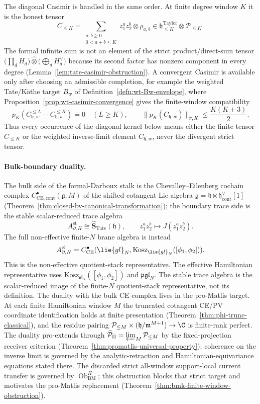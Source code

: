 \documentclass[11pt]{memoir}
\begin{document}
The diagonal Casimir is handled in the same order.  At finite degree
window \(K\) it is the honest tensor
\[
  C_{\le K}=\sum_{\substack{a,b\ge0\\0<a+b\le K}}
    z_1^az_2^b\otimes\rho_{a,b}
  \in \mathfrak h^{\mathrm{Taylor}}_{\le K}\otimes\mathcal P_{\le K}.
\]
The formal infinite sum is not an element of the strict
product/direct-sum tensor
\(\bigl(\prod_d H_d\bigr)\widehat\otimes\bigl(\bigoplus_d H_d^\vee\bigr)\)
because its second factor has nonzero component in every degree
(Lemma~\ref{lem:tate-casimir-obstruction}).  A convergent Casimir is
available only after choosing an admissible completion, for example the
weighted Tate/K\"othe target \(B_w\) of
Definition~\ref{defn:wt-Bw-envelope}, where
Proposition~\ref{prop:wt-casimir-convergence} gives the finite-window
compatibility
\[
  p_K(C_{\mathfrak h,w}^{\le L}-C_{\mathfrak h,w}^{\le K})=0
  \quad(L\ge K),
  \qquad
  \|p_K(C_{\mathfrak h,w})\|_{\pi,K}\le \frac{K(K+3)}2 .
  \]
Thus every occurrence of the diagonal kernel below means either the
finite tensor \(C_{\le K}\) or the weighted inverse-limit element
\(C_{\mathfrak h,w}\), never the divergent strict tensor.

\paragraph{Bulk-boundary duality.}
The bulk side of the formal-Darboux stalk is the
Chevalley--Eilenberg cochain complex
\(C^\bullet_{\mathrm{CE,cont}}(\mathfrak g,M)\) of the
shifted-cotangent Lie algebra
\(\mathfrak g=\mathfrak h\ltimes\mathfrak h^\vee_{\mathrm{cont}}[1]\)
(Theorem~\ref{thm:closed-bv-canonical-transformation}); the boundary
trace side is the stable scalar-reduced trace algebra
\[
  A_{\partial,H}^{\mathrm{st}}
    \cong \widehat{\mathbf S}_{\mathrm{Tate}}(\mathfrak h),
  \qquad
  z_1^az_2^b\longmapsto J(z_1^az_2^b).
\]
The full non-effective finite-\(N\) brane algebra is instead
\[
  A^{\mathrm{cl}}_{\partial,N}=
  C^\bullet_{\mathrm{CE}}
  (\lie{gl}_N,\mathrm{Kosz}_{\lie{gl}_N}([\phi_1,\phi_2])).
\]
This is the non-effective quotient-stack representative.  The effective
Hamiltonian representative uses
\(\mathrm{Kosz}_{\mathfrak{sl}_N}([\phi_1,\phi_2])\) and
\(\mathfrak{pgl}_N\).  The stable trace algebra is the scalar-reduced
image of the finite-\(N\) quotient-stack representative, not its
definition.  The duality with the bulk CE complex lives in the
pro-Matlis target.  At each finite Hamiltonian window \(M\) the
truncated cotangent CE/PV coordinate identification holds at finite
presentation (Theorem~\ref{thm:phi-trunc-classical}), and the residue
pairing
\(\mathcal P_{\le M}\times(\mathfrak h/\mathfrak m^{M+1})\to\C\) is
finite-rank perfect.  The duality pro-extends through
\(\widehat{\mathcal P}_\Pi=\varprojlim_M\mathcal P_{\le M}\) by the
fixed-projection receiver criterion
(Theorem~\ref{thm:promatlis-universal-property}); coherence on the
inverse limit is governed by the analytic-retraction and
Hamiltonian-equivariance equations stated there.  The discarded strict all-window
support-local current transfer is governed by
\(\operatorname{Ob}^\Pi_{\mathrm{BM}}\); this obstruction blocks that
strict target and motivates the pro-Matlis replacement
(Theorem~\ref{thm:bmk-finite-window-obstruction}).
\end{document}
